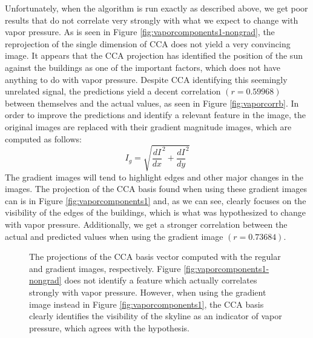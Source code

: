 Unfortunately, when the algorithm is run exactly as described above, we get poor results that do not correlate very strongly with what we expect to change with vapor pressure. As is seen in Figure \ref{fig:vaporcomponents1-nongrad}, the reprojection of the single dimension of CCA does not yield a very convincing image. It appears that the CCA projection has identified the position of the sun against the buildings as one of the important factors, which does not have anything to do with vapor pressure. Despite CCA identifying this seemingly unrelated signal, the predictions yield a decent correlation $(r=0.59968)$ between themselves and the actual values, as seen in Figure \ref{fig:vaporcorrb}. In order to improve the predictions and identify a relevant feature in the image, the original images are replaced with their gradient magnitude images, which are computed as follows:
\begin{equation}\label{eq:grad}I_g=\sqrt{\frac{dI}{dx}^2 + \frac{dI}{dy}^2}\end{equation}
The gradient images will tend to highlight edges and other major changes in the images. The projection of the CCA basis found when using these gradient images can is in Figure \ref{fig:vaporcomponents1} and, as we can see, clearly focuses on the visibility of the edges of the buildings, which is what was hypothesized to change with vapor pressure. Additionally, we get a stronger correlation between the actual and predicted values when using the gradient image $(r=0.73684)$.
\begin{figure}
	\centering
	\caption{The projections of the CCA basis vector computed with the regular and gradient images, respectively. Figure \ref{fig:vaporcomponents1-nongrad} does not identify a feature which actually correlates strongly with vapor pressure. However, when using the gradient image instead in Figure \ref{fig:vaporcomponents1}, the CCA basis clearly identifies the visibility of the skyline as an indicator of vapor pressure, which agrees with the hypothesis.}
	\label{fig:vaporcomponents}
\end{figure}
